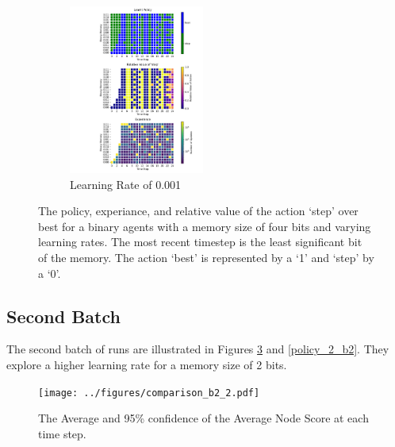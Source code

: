 \documentclass[a4paper]{article}
\begin{document}
\begin{figure}[ht]
    \begin{subfigure}[b]{0.24\textwidth}
        \centering
        \includegraphics[width=12em]{../figures/policy_b4_lr001.pdf}
        \caption{Learning Rate of 0.001}
        \label{b4_lr001}
    \end{subfigure}
    \caption{
        The policy, experiance, and relative value of the action `step'
        over best for a binary agents with a memory size of four bits
        and varying learning rates. The most recent timestep
        is the least significant bit of the memory.
        The action `best' is represented by a `1' and `step' by a `0'.
    }
    \label{policy_b4}
\end{figure}

\subsection*{Second Batch}
The second batch of runs are illustrated in Figures \ref{comp_2}
and \ref{policy_2_b2}.
They explore a higher learning rate for a memory size of 2 bits.

\begin{figure}[ht]
    \centering
    \texttt{[image: ../figures/comparison\_b2\_2.pdf]}
    \caption{
        The Average and 95\% confidence of the Average Node Score
        at each time step.
    }
    \label{comp_2}
\end{figure}
\end{document}
